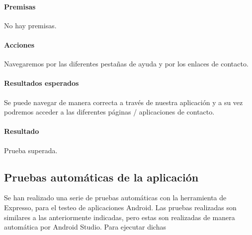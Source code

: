 \paragraph{Premisas}
No hay premisas.

\paragraph{Acciones}
Navegaremos por las diferentes pestañas de ayuda y por los enlaces de contacto.

\paragraph{Resultados esperados}
Se puede navegar de manera correcta a través de nuestra aplicación y a su vez podremos acceder a las diferentes páginas / aplicaciones de contacto.

\paragraph{Resultado}
Prueba superada.

\subsection{Pruebas automáticas de la aplicación}
Se han realizado una serie de pruebas automáticas con la herramienta de Expresso, para el testeo de aplicaciones Android. Las pruebas realizadas son similares a las anteriormente indicadas, pero estas son realizadas de manera automática por Android Studio. Para ejecutar dichas 